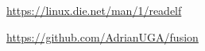 \documentclass[10pt,oneside]{article}   %
\begin{document}
\begin{thebibliography}{9}

\url{https://linux.die.net/man/1/readelf}

\url{https://github.com/AdrianUGA/fusion}


\end{thebibliography}
\end{document}
